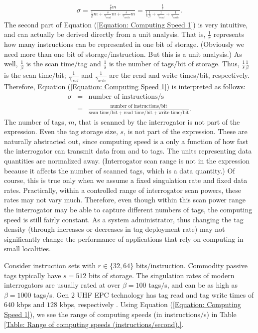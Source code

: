 \begin{eqnarray}
\sigma = \frac{\frac{s}{r}m}{\frac{1}{\beta} m + \frac{s}{\gamma_{read}}m + \frac{s}{\gamma_{write}}m } =  \frac{\frac{1}{r}}{\frac{1}{s}\frac{1}{\beta} + \frac{1}{\gamma_{read}} + \frac{1}{\gamma_{write}} }.
\label{Equation: Computing Speed 1}
\end{eqnarray}
The second part of Equation (\ref{Equation: Computing Speed 1}) is very intuitive, and can actually be derived directly from a unit analysis. That is, $\frac{1}{r}$ represents how many instructions can be represented in one bit of storage. (Obviously we need more than one bit of storage$/$instruction. But this is a unit analysis.) As well, $\frac{1}{\beta}$ is the scan time$/$tag and $\frac{1}{s}$ is the number of tags$/$bit of storage. Thus, $\frac{1}{s}\frac{1}{\beta}$ is the scan time$/$bit; $\frac{1}{\gamma_{read}}$ and $\frac{1}{\gamma_{write}}$ are the read and write times$/$bit, respectively. Therefore, Equation (\ref{Equation: Computing Speed 1}) is interpreted as follows:
\begin{eqnarray}
\sigma &= &\mbox{number of instructions$/$s}  \nonumber \\
& = &\frac{\mbox{number of instructions$/$bit}}{\mbox{scan time$/$bit} + \mbox{read time$/$bit} + \mbox{write time$/$bit} }.
\label{Equation: Computing Speed 2}
\end{eqnarray}
The number of tags, $m$, that is scanned by the interrogator is not part of the expression. Even the tag storage size, $s$, is not part of the expression. These are naturally abstracted out, since computing speed is a only a function of how fast the interrogator can transmit data from and to tags. The units representing data quantities are normalized away. (Interrogator scan range is not in the expression because it affects the number of scanned tags, which is a data quantity.) Of course, this is true only when we assume a fixed singulation rate and fixed data rates. Practically, within a controlled range of interrogator scan powers, these rates may not vary much. Therefore, even though within this scan power range the interrogator may be able to capture different numbers of tags, the computing speed is still fairly constant. As a system administrator, thus changing the tag density (through increases or decreases in tag deployment rate) may not significantly change the performance of applications that rely on computing in small localities.

Consider instruction sets with $r \in \{32, 64\}$ bits$/$instruction. Commodity passive tags typically have $s = 512$ bits of storage. The singulation rates of modern interrogators are usually rated at over $\beta = 100$ tags$/$s, and can be as high as $\beta = 1000$ tags$/$s. Gen 2 UHF EPC technology has tag read and tag write times of $640$ kbps and $128$ kbps, respectively \cite{2005 Fischer}. Using Equation (\ref{Equation: Computing Speed 1}), we see the range of computing speeds (in instructions$/$s) in Table \ref{Table: Range of computing speeds (instructions/second).}.


